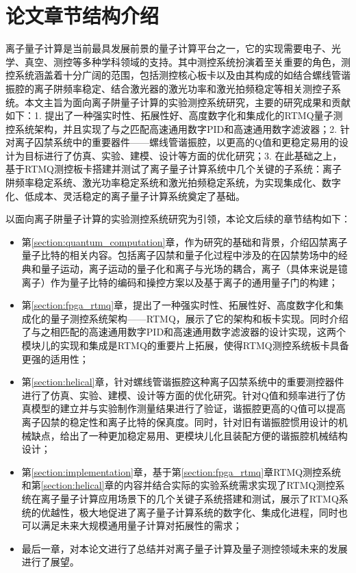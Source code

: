 \section[论文章节结构介绍]{论文章节结构介绍}
离子量子计算是当前最具发展前景的量子计算平台之一，它的实现需要电子、光学、真空、测控等多种学科领域的支持。其中测控系统扮演着至关重要的角色，测控系统涵盖着十分广阔的范围，包括测控核心板卡以及由其构成的如结合螺线管谐振腔的离子阱频率稳定、结合激光器的激光功率和激光拍频稳定等相关测控子系统。本文主旨为面向离子阱量子计算的实验测控系统研究，主要的研究成果和贡献如下：1. 提出了一种强实时性、拓展性好、高度数字化和集成化的RTMQ量子测控系统架构，并且实现了与之匹配高速通用数字PID和高速通用数字滤波器；2. 针对离子囚禁系统中的重要器件——螺线管谐振腔，以更高的Q值和更稳定易用的设计为目标进行了仿真、实验、建模、设计等方面的优化研究；3. 在此基础之上，基于RTMQ测控板卡搭建并测试了离子量子计算系统中几个关键的子系统：离子阱频率稳定系统、激光功率稳定系统和激光拍频稳定系统，为实现集成化、数字化、低成本、灵活稳定的离子量子计算系统奠定了基础。

以面向离子阱量子计算的实验测控系统研究为引领，本论文后续的章节结构如下：
\begin{itemize}
    \item 第\ref{section:quantum_computation}章，作为研究的基础和背景，介绍囚禁离子量子比特的相关内容。包括离子囚禁和量子化过程中涉及的在囚禁势场中的经典和量子运动，离子运动的量子化和离子与光场的耦合，离子（具体来说是镱离子）作为量子比特的编码和操控方案以及基于离子的通用量子门的构建；
    \item 第\ref{section:fpga_rtmq}章，提出了一种强实时性、拓展性好、高度数字化和集成化的量子测控系统架构——RTMQ，展示了它的架构和板卡实现。同时介绍了与之相匹配的高速通用数字PID和高速通用数字滤波器的设计实现，这两个模块儿的实现和集成是RTMQ的重要片上拓展，使得RTMQ测控系统板卡具备更强的适用性；
    \item 第\ref{section:helical}章，针对螺线管谐振腔这种离子囚禁系统中的重要测控器件进行了仿真、实验、建模、设计等方面的优化研究。针对Q值和频率进行了仿真模型的建立并与实验制作测量结果进行了验证，谐振腔更高的Q值可以提高离子囚禁的稳定性和离子比特的保真度。同时，针对旧有谐振腔惯用设计的机械缺点，给出了一种更加稳定易用、更模块儿化且装配方便的谐振腔机械结构设计；
    \item 第\ref{section:implementation}章，基于第\ref{section:fpga_rtmq}章RTMQ测控系统和第\ref{section:helical}章的内容并结合实际的实验系统需求实现了RTMQ测控系统在离子量子计算应用场景下的几个关键子系统搭建和测试，展示了RTMQ系统的优越性，极大地促进了离子量子计算系统的数字化、集成化进程，同时也可以满足未来大规模通用量子计算对拓展性的需求；
    \item 最后一章，对本论文进行了总结并对离子量子计算及量子测控领域未来的发展进行了展望。
\end{itemize}